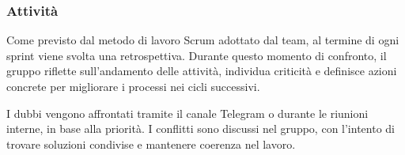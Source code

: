 \subsubsection{Attività}
Come previsto dal metodo di lavoro Scrum adottato dal team, al termine di ogni sprint viene svolta una retrospettiva.  
Durante questo momento di confronto, il gruppo riflette sull’andamento delle attività, individua criticità e definisce  
azioni concrete per migliorare i processi nei cicli successivi.

I dubbi vengono affrontati tramite il canale Telegram o durante le riunioni 
interne, in base alla priorità. I conflitti sono discussi nel gruppo, con 
l’intento di trovare soluzioni condivise e mantenere coerenza nel lavoro.



